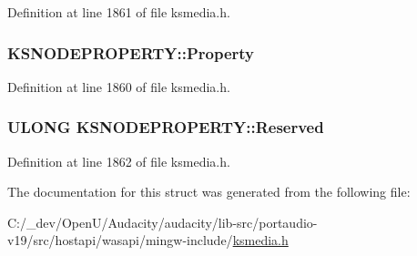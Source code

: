 Definition at line 1861 of file ksmedia.\+h.

\subsubsection[{\texorpdfstring{Property}{Property}}]{ K\+S\+N\+O\+D\+E\+P\+R\+O\+P\+E\+R\+T\+Y\+::\+Property}\hypertarget{struct_k_s_n_o_d_e_p_r_o_p_e_r_t_y_a26945962aee6c686cd0c6963c3a157b4}{}\label{struct_k_s_n_o_d_e_p_r_o_p_e_r_t_y_a26945962aee6c686cd0c6963c3a157b4}


Definition at line 1860 of file ksmedia.\+h.

\subsubsection[{\texorpdfstring{Reserved}{Reserved}}]{\setlength{\rightskip}{0pt plus 5cm}U\+L\+O\+NG K\+S\+N\+O\+D\+E\+P\+R\+O\+P\+E\+R\+T\+Y\+::\+Reserved}\hypertarget{struct_k_s_n_o_d_e_p_r_o_p_e_r_t_y_aa4e8e25e0bebd3dfcb0d4a79524e33fd}{}\label{struct_k_s_n_o_d_e_p_r_o_p_e_r_t_y_aa4e8e25e0bebd3dfcb0d4a79524e33fd}


Definition at line 1862 of file ksmedia.\+h.



The documentation for this struct was generated from the following file\+:\begin{DoxyCompactItemize}
\item 
C\+:/\+\_\+dev/\+Open\+U/\+Audacity/audacity/lib-\/src/portaudio-\/v19/src/hostapi/wasapi/mingw-\/include/\hyperlink{ksmedia_8h}{ksmedia.\+h}\end{DoxyCompactItemize}
